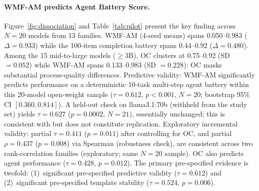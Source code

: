 \documentclass{article}
\begin{document}
\paragraph{WMF-AM predicts Agent Battery Score.}
Figure~\ref{fig:dissociation} and Table~\ref{tab:pilot} present the key
finding across $N{=}20$ models from 13 families. WMF-AM (4-seed means)
spans 0.050--0.983 ($\Delta = 0.933$) while the 100-item completion
battery spans 0.44--0.92 ($\Delta = 0.480$).
Among the 15 mid-to-large models ($\geq$3B), OC clusters
at 0.75--0.92 (SD $= 0.052$) while WMF-AM spans 0.133--0.983 (SD $= 0.228$):
OC masks substantial process-quality differences.
Predictive validity: WMF-AM significantly predicts
performance on a deterministic 10-task multi-step agent battery within this 20-model open-weight sample
($\tau = 0.612$, $p < 0.001$, $N{=}20$;
bootstrap 95\% CI $[0.360, 0.814]$).
A held-out check on llama3.1:70b (withheld from the study set)
yields $\tau = 0.627$ ($p = 0.0002$, $N{=}21$), essentially unchanged;
this is consistent with but does not constitute replication.
Exploratory incremental validity:
partial $\tau = 0.411$ ($p = 0.011$) after controlling for OC,
and partial $\rho = 0.437$ ($p = 0.008$) via Spearman (robustness check),
are consistent across two rank-correlation families (exploratory; same $N{=}20$ sample).
OC also predicts agent performance ($\tau = 0.428$, $p = 0.012$).
The primary pre-specified evidence is twofold:
(1)~significant pre-specified predictive validity ($\tau = 0.612$) and
(2)~significant pre-specified template stability ($\tau = 0.524$, $p = 0.006$).
\end{document}
